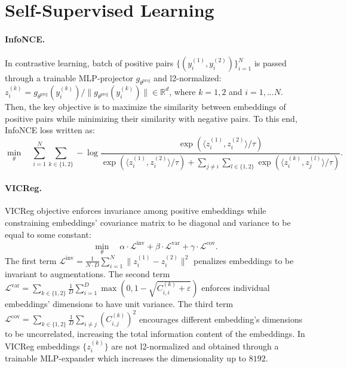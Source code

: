 
\section{Self-Supervised Learning}
\label{appendix:ssl}

\paragraph{InfoNCE.} In contrastive learning, batch of positive pairs $\{(y^{(1)}_i, y^{(2)}_i)\}_{i = 1}^N$ is passed through a trainable MLP-projector $g_{\theta^{\text{proj}}}$ and l2-normalized: ${z^{(k)}_i = g_{\theta^{\text{proj}}}(y^{(k)}_i) / \|g_{\theta^{\text{proj}}}(y^{(k)}_i)\| \in \mathbb{R}^d}$, where ${k = 1, 2}$ and ${i = 1, \ldots N}$. Then, the key objective is to maximize the similarity between embeddings of positive pairs while minimizing their similarity with negative pairs. To this end, InfoNCE loss written as:
\begin{equation}
    \min_{\theta} \quad \sum_{i = 1}^N \sum_{k \in \{1, 2\}} - \log\frac{\exp(\langle z_i^{(1)}, z_i^{(2)} \rangle / \tau)}{\exp(\langle z_i^{(1)}, z_i^{(2)} \rangle / \tau) + \sum_{j \ne i} \sum_{l \in \{1, 2\}} \exp(\langle z_i^{(k)}, z_j^{(l)} \rangle / \tau)}.
    \label{eq:infonce}
\end{equation}

\paragraph{VICReg.} VICReg objective enforces invariance among positive embeddings while constraining embeddings' covariance matrix to be diagonal and variance to be equal to some constant:
\begin{equation}
    \min_{\theta} \quad \alpha \cdot \mathcal{L}^{\text{inv}} + \beta \cdot \mathcal{L}^{\text{var}} + \gamma \cdot \mathcal{L}^{\text{cov}}.
\end{equation}
The first term ${\mathcal{L}^{\text{inv}} = \frac{1}{N \cdot D} \sum_{i = 1}^N \|z^{(1)}_i - z^{(2)}_i\|^2}$ penalizes embeddings to be 
invariant to augmentations. The second term ${\mathcal{L}^{\text{var}} = \sum\limits_{k \in \{1, 2\}} \frac{1}{D} \sum\limits_{i = 1}^{D} \max \left(0, 1 - \sqrt{C^{(k)}_{i,i} + \varepsilon}\right)}$ enforces individual embeddings' dimensions to have unit variance. The third term ${\mathcal{L}^{\text{cov}} = \sum_{k \in \{1, 2\}} \frac{1}{D} \sum_{i \ne j} \left(C^{(k)}_{i, j}\right)^2}$ encourages different embedding's dimensions to be uncorrelated, increasing the total information content of the embeddings. In VICReg embeddings $\{z^{(k)}_i\}$ are not l2-normalized and obtained through a trainable MLP-expander which increases the dimensionality up to $8192$.
